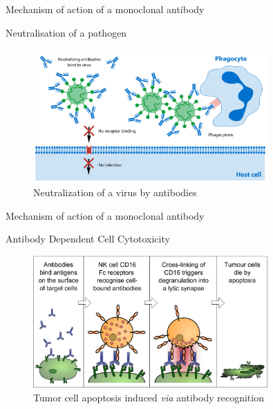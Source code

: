 \begin{frame}{Mechanism of action of a monoclonal antibody}
    \begin{block}{Neutralisation of a pathogen}
        \begin{figure}
            \centering
            \includegraphics[width=0.8\textwidth]{../Images/antibodies_neutralization.jpeg}
            \caption{Neutralization of a virus by antibodies}
            \label{fig:neutralization_antibodies}
        \end{figure}
    \end{block}
\end{frame}

\begin{frame}{Mechanism of action of a monoclonal antibody}
    \begin{block}{Antibody Dependent Cell Cytotoxicity}
        \begin{figure}
            \centering
            \includegraphics[width=0.8\textwidth]{../Images/Antibody-dependent_Cellular_Cytotoxicity.svg.png}
            \caption{Tumor cell apoptosis induced \emph{via} antibody recognition}
            \label{fig:ADCC}
        \end{figure}
    \end{block}
\end{frame}

